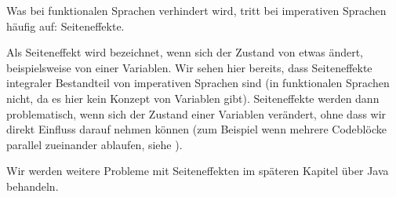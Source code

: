 	Was bei funktionalen Sprachen verhindert wird, tritt bei imperativen Sprachen häufig auf: Seiteneffekte.
	
	Als Seiteneffekt wird bezeichnet, wenn sich der Zustand von etwas ändert, beispielsweise von einer Variablen. Wir sehen hier bereits, dass Seiteneffekte integraler Bestandteil von imperativen Sprachen sind (in funktionalen Sprachen nicht, da es hier kein Konzept von Variablen gibt). Seiteneffekte werden dann problematisch, wenn sich der Zustand einer Variablen verändert, ohne dass wir direkt Einfluss darauf nehmen können (zum Beispiel wenn mehrere Codeblöcke parallel zueinander ablaufen, siehe ).
	
	Wir werden weitere Probleme mit Seiteneffekten im späteren Kapitel über Java behandeln.
